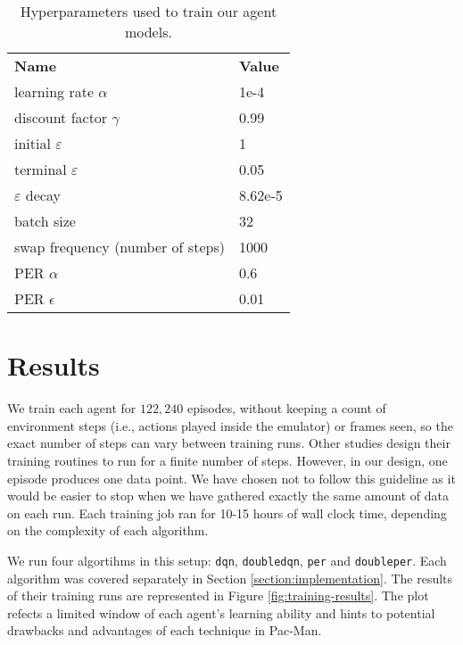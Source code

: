 \begin{table}
    \centering
        \begin{tabular}{ll}
            \textbf{Name}                  & \textbf{Value}   \\
            learning rate $\alpha$             & 1e-4    \\
            discount factor $\gamma$           & 0.99    \\
            initial $\varepsilon$              & 1       \\
            terminal $\varepsilon$             & 0.05    \\
            $\varepsilon$ decay                & 8.62e-5 \\
            batch size                         & 32      \\
            swap frequency (number of steps)   & 1000    \\
            PER $\alpha$                       & 0.6     \\
            PER $\epsilon$                     & 0.01    \\
        \end{tabular}%
        \caption{Hyperparameters used to train our agent models.}
    \label{tab:our-hyperparameters}
\end{table}

\section*{Results}
We train each agent for $122,240$ episodes, without keeping a count of environment steps (i.e., actions played inside the emulator) or frames seen, so the exact number of steps can vary between training runs.
Other studies design their training routines to run for a finite number of steps.
However, in our design, one episode produces one data point. We have chosen not to follow this guideline as it would be easier to stop when we have gathered exactly the same amount of data on each run.
Each training job ran for 10-15 hours of wall clock time, depending on the complexity of each algorithm.

We run four algortihms in this setup: \texttt{dqn}, \texttt{doubledqn}, \texttt{per} and \texttt{doubleper}.
Each algorithm was covered separately in Section \ref{section:implementation}.
The results of their training runs are represented in Figure \ref{fig:training-results}.
The plot refects a limited window of each agent's learning ability and hints to potential drawbacks and advantages of each technique in Pac-Man.

